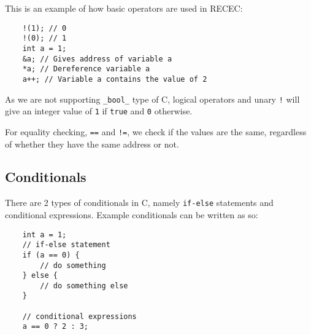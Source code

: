 \documentclass[a4paper]{article}
\begin{document}
This is an example of how basic operators are used in RECEC: 

\begin{verbatim}
	!(1); // 0
	!(0); // 1
	int a = 1;
	&a; // Gives address of variable a
	*a; // Dereference variable a
	a++; // Variable a contains the value of 2
\end{verbatim}

As we are not supporting \texttt{\_bool\_} type of C, logical operators and unary \texttt{!} will give an integer value of \texttt{1} if \texttt{true} and \texttt{0} otherwise. 

For equality checking, \texttt{==} and \texttt{!=}, we check if the values are the same, regardless of whether they have the same address or not. 

\subsection{Conditionals}

There are 2 types of conditionals in C, namely \texttt{if-else} statements and conditional expressions. Example conditionals can be written as so:

\begin{verbatim}
	int a = 1;
	// if-else statement
	if (a == 0) {
		// do something
	} else {
		// do something else
	}

	// conditional expressions
	a == 0 ? 2 : 3;
\end{verbatim}
\end{document}
